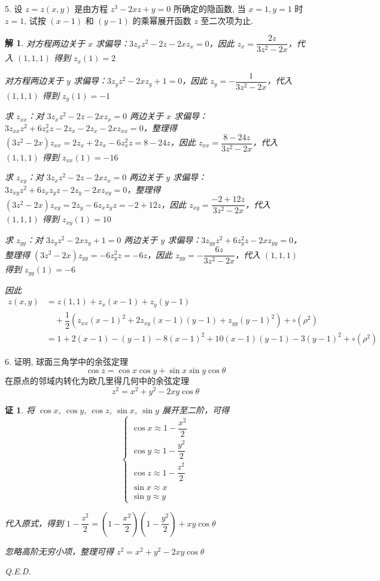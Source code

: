 \documentclass[a4paper,12pt]{article}
\newtheorem*{pf}{证}
\newtheorem*{sol}{解}
\begin{document}
5. 设 $z = z(x,y)$ 是由方程 $z^3 - 2xz + y = 0$ 所确定的隐函数, 当 $x=1,y=1$ 时 $z=1$, 试按 $(x-1)$ 和 $(y-1)$ 的乘幂展开函数 $z$ 至二次项为止.
\begin{sol}
    对方程两边关于 $x$ 求偏导：$3z_xz^2-2z-2xz_x=0$，因此 $z_x=\dfrac{2z}{3z^2-2x}$，代入 $(1,1,1)$ 得到 $z_x(1)=2$

    对方程两边关于 $y$ 求偏导：$3z_yz^2-2xz_y+1=0$，因此 $z_y=-\dfrac{1}{3z^2-2x}$，代入 $(1,1,1)$ 得到 $z_y(1)=-1$

    求 $z_{xx}$：对 $3z_xz^2-2z-2xz_x=0$ 两边关于 $x$ 求偏导：$3z_{xx}z^2+6z_x^2z-2z_x-2z_x-2xz_{xx}=0$，整理得 $(3z^2-2x)z_{xx}=2z_x+2z_x-6z_x^2z=8-24z$，因此 $z_{xx}=\dfrac{8-24z}{3z^2-2x}$，代入 $(1,1,1)$ 得到 $z_{xx}(1)=-16$

    求 $z_{xy}$：对 $3z_xz^2-2z-2xz_x=0$ 两边关于 $y$ 求偏导：$3z_{xy}z^2+6z_xz_yz-2z_y-2xz_{xy}=0$，整理得 $(3z^2-2x)z_{xy}=2z_y-6z_xz_yz=-2+12z$，因此 $z_{xy}=\dfrac{-2+12z}{3z^2-2x}$，代入 $(1,1,1)$ 得到 $z_{xy}(1)=10$

    求 $z_{yy}$：对 $3z_yz^2-2xz_y+1=0$ 两边关于 $y$ 求偏导：$3z_{yy}z^2+6z_y^2z-2xz_{yy}=0$，整理得 $(3z^2-2x)z_{yy}=-6z_y^2z=-6z$，因此 $z_{yy}=-\dfrac{6z}{3z^2-2x}$，代入 $(1,1,1)$ 得到 $z_{yy}(1)=-6$

    因此
    \begin{align*}
        z(x,y) & =z(1,1)+z_x(x-1)+z_y(y-1)                                                                  \\
               & \quad+\dfrac{1}{2}\left(z_{xx}(x-1)^2+2z_{xy}(x-1)(y-1)+z_{yy}(y-1)^2\right)+\circ(\rho^2) \\
               & =1+2(x-1)-(y-1)-8(x-1)^2+10(x-1)(y-1)-3(y-1)^2+\circ(\rho^2)
    \end{align*}
\end{sol}

6. 证明, 球面三角学中的余弦定理
$$
    \cos z = \cos x \cos y + \sin x \sin y \cos \theta
$$
在原点的邻域内转化为欧几里得几何中的余弦定理
$$
    z^2 = x^2 + y^2 - 2xy \cos \theta
$$
\begin{pf}
    将 $\cos x$, $\cos y$, $\cos z$, $\sin x$, $\sin y$ 展开至二阶，可得
    $$
        \begin{cases}
            \cos x\approx1-\dfrac{x^2}{2} \\
            \cos y\approx1-\dfrac{y^2}{2} \\
            \cos z\approx1-\dfrac{z^2}{2} \\
            \sin x\approx x               \\
            \sin y\approx y
        \end{cases}
    $$

    代入原式，得到 $1-\dfrac{z^2}{2}=\left(1-\dfrac{x^2}{2}\right)\left(1-\dfrac{y^2}{2}\right)+xy\cos\theta$

    忽略高阶无穷小项，整理可得 $z^2 = x^2 + y^2 - 2xy \cos \theta$

    Q.E.D.
\end{pf}
\end{document}
